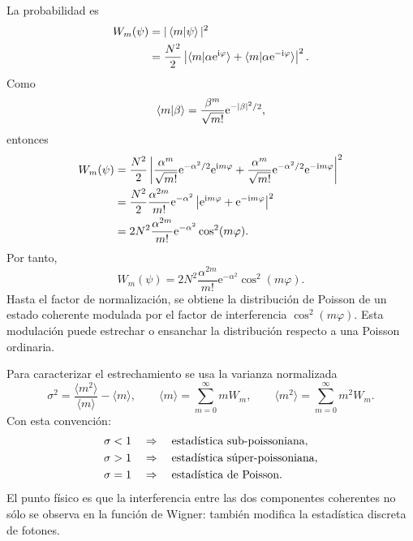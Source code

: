 \documentclass[11pt]{article}
\newcommand{\ii}{\mathrm{i}}
\newcommand{\ee}{\mathrm{e}}
\begin{document}
La probabilidad es
\begin{align}
  W_m(\psi)
  &=
  |\braket{m|\psi}|^2 \notag\\
  &=
  \frac{N^2}{2}
  \left|
  \braket{m|\alpha\ee^{\ii\varphi}}
  +
  \braket{m|\alpha\ee^{-\ii\varphi}}
  \right|^2.
\end{align}
Como
\begin{equation}
  \braket{m|\beta}
  =
  \frac{\beta^m}{\sqrt{m!}}\ee^{-|\beta|^2/2},
\end{equation}
entonces
\begin{align}
  W_m(\psi)
  &=
  \frac{N^2}{2}
  \left|
  \frac{\alpha^m}{\sqrt{m!}}\ee^{-\alpha^2/2}\ee^{\ii m\varphi}
  +
  \frac{\alpha^m}{\sqrt{m!}}\ee^{-\alpha^2/2}\ee^{-\ii m\varphi}
  \right|^2 \notag\\
  &=
  \frac{N^2}{2}
  \frac{\alpha^{2m}}{m!}\ee^{-\alpha^2}
  \left|\ee^{\ii m\varphi}+\ee^{-\ii m\varphi}\right|^2 \notag\\
  &=
  2N^2
  \frac{\alpha^{2m}}{m!}\ee^{-\alpha^2}
  \cos^2(m\varphi).
\end{align}
Por tanto,
\begin{equation}
  \boxed{
  W_m(\psi)
  =
  2N^2
  \frac{\alpha^{2m}}{m!}\ee^{-\alpha^2}
  \cos^2(m\varphi).
  }
\end{equation}
Hasta el factor de normalizaci\'on, se obtiene la distribuci\'on de Poisson de
un estado coherente modulada por el factor de interferencia
$\cos^2(m\varphi)$. Esta modulaci\'on puede estrechar o ensanchar la
distribuci\'on respecto a una Poisson ordinaria.

Para caracterizar el estrechamiento se usa la varianza normalizada
\begin{equation}
  \sigma^2
  =
  \frac{\langle m^2\rangle}{\langle m\rangle}
  -
  \langle m\rangle,
  \qquad
  \langle m\rangle=\sum_{m=0}^{\infty}mW_m,
  \qquad
  \langle m^2\rangle=\sum_{m=0}^{\infty}m^2W_m.
\end{equation}
Con esta convenci\'on:
\begin{align}
  \sigma<1
  &\quad\Rightarrow\quad
  \text{estad\'istica sub-poissoniana}, \notag\\
  \sigma>1
  &\quad\Rightarrow\quad
  \text{estad\'istica s\'uper-poissoniana}, \notag\\
  \sigma=1
  &\quad\Rightarrow\quad
  \text{estad\'istica de Poisson}.
\end{align}
El punto f\'isico es que la interferencia entre las dos componentes coherentes
no s\'olo se observa en la funci\'on de Wigner: tambi\'en modifica la
estad\'istica discreta de fotones.
\end{document}
